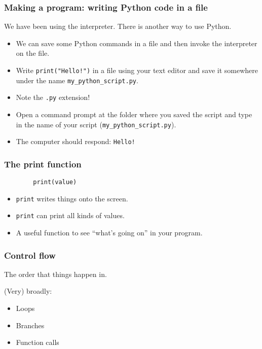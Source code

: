 \documentclass[presentation]{beamer}
\begin{document}
	\begin{frame}[fragile]
		\frametitle{Making a program: writing Python code in a file}
		We have been using the interpreter. There is another way to use Python.
		\begin{itemize}
			\item We can save some Python commands in a file and then invoke the interpreter on the file.
			\pause
			\item Write \colorbox{codebg}{\lstinline|print("Hello!")|} in a file using your text editor and save it somewhere under the name \lstinline|my_python_script.py|.
			\item Note the \lstinline|.py| extension!
			\pause
			\item Open a command prompt at the folder where you saved the script and type in the name of your script (\lstinline|my_python_script.py|).
			\item The computer should respond: \texttt{Hello!}
		\end{itemize}
	\end{frame}
	
	\begin{frame}[fragile]
		\frametitle{The print function}
		\begin{lstlisting}
		print(value)
		\end{lstlisting}
		\begin{itemize}
			\item \lstinline|print| writes things onto the screen.
			\pause
			\item \lstinline|print| can print all kinds of values.
			\pause
			\item A useful function to see ``what's going on'' in your program.
		\end{itemize}
	\end{frame}
	
	\begin{frame}[fragile]
		\frametitle{Control flow}
		The order that things happen in.

		\pause

		(Very) broadly:
		\begin{itemize}
			\item Loops
			\item Branches
			\item Function calls
		\end{itemize}

	\end{frame}
\end{document}
